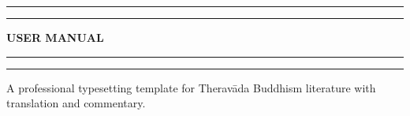 %
\frontmatter
\begin{titlepage} %

	\centering %
	
	\scshape %
	
	\vspace*{\baselineskip} %
	
	
	\rule{\textwidth}{1.6pt}\vspace*{-\baselineskip}\vspace*{2pt} %
	\rule{\textwidth}{0.4pt} %
	
	\vspace{0.75\baselineskip} %
	
	{\LARGE \textbf{USER MANUAL}\\} %
	
	\vspace{0.75\baselineskip} %
	
	\rule{\textwidth}{0.4pt}\vspace*{-\baselineskip}\vspace{3.2pt} %
	\rule{\textwidth}{1.6pt} %
	
	\vspace{2\baselineskip} %
	
	
    A professional typesetting template for Theravāda Buddhism literature with translation and commentary. %
	
	\vspace*{3\baselineskip} %
	
	
	
	\vspace{0.5\baselineskip} %
	

\end{titlepage}
